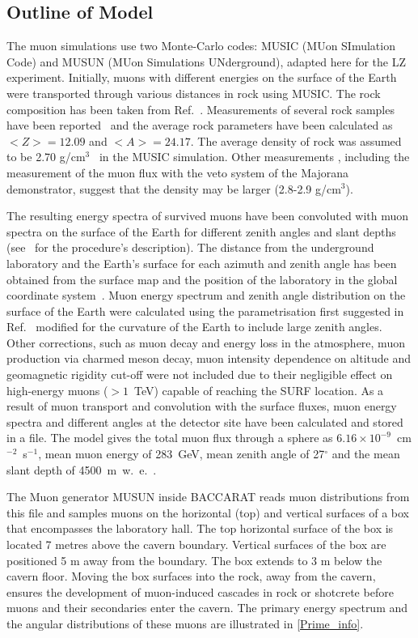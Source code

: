 \subsection{Outline of Model}
The muon simulations use two Monte-Carlo codes: MUSIC (MUon SImulation Code) and MUSUN (MUon Simulations UNderground)\cite{music,musun}, adapted here for the LZ experiment. Initially, muons with different energies on the surface of the Earth were transported through various distances in rock using MUSIC. The rock composition has been taken from Ref.~\cite{mei,zhang}. Measurements of several rock samples have been reported~\cite{mei,zhang} and the average rock parameters have been calculated as $<Z>=12.09$ and $<A>=24.17$. The average density of rock was assumed to be 2.70 g/cm$^3$~\cite{zhang} in the MUSIC simulation. Other measurements \cite{heise}, including the measurement of the muon flux with the veto system of the Majorana demonstrator, suggest that the density may be larger (2.8-2.9 g/cm$^3$\cite{majorana}).

The resulting energy spectra of survived muons have been convoluted with muon spectra on the surface of the Earth for different zenith angles and slant depths (see~\cite{musun} for the procedure's description). The distance from the underground laboratory and the Earth's surface for each azimuth and zenith angle has been obtained from the surface map and the position of the laboratory in the global coordinate system~\cite{richardson}.
Muon energy spectrum and zenith angle distribution on the surface of the Earth were calculated using the parametrisation first suggested in Ref.~\cite{gaisser} modified for the curvature of the Earth to include large zenith angles. Other corrections, such as muon decay and energy loss in the atmosphere, muon production via charmed meson decay, muon intensity dependence on altitude and geomagnetic rigidity cut-off were not included due to their negligible effect on high-energy muons ($>1$~TeV) capable of reaching the SURF location.
As a result of muon transport and convolution with the surface fluxes, muon energy spectra and different angles at the detector site have been calculated and stored in a file. The model gives the total muon flux through a sphere as $6.16\times10^{-9}$~cm$^{-2}$~s$^{-1}$, mean muon energy of 283~GeV, mean zenith angle of 27$^{\circ}$ and the mean slant depth of 4500~m~w.~e.~\cite{musun-lz}.

The Muon generator MUSUN inside BACCARAT reads muon distributions from this file and samples muons on the horizontal (top) and vertical surfaces of a box that encompasses the laboratory hall. The top horizontal surface of the box is located 7 metres above the cavern boundary. Vertical surfaces of the box are positioned 5 m away from the boundary. The box extends to 3 m below the cavern floor. Moving the box surfaces into the rock, away from the cavern, ensures the development of muon-induced cascades in rock or shotcrete before muons and their secondaries enter the cavern. The primary energy spectrum and the angular distributions of these muons are illustrated in \autoref{Prime_info}.

